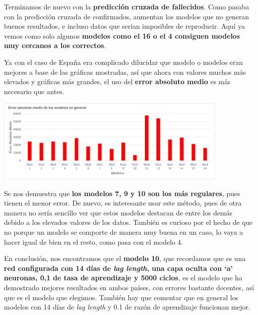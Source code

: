 \documentclass[12pt,a4paper, xcolor=table]{article}
\begin{document}
            Terminamos de nuevo con la \textbf{predicción cruzada de fallecidos}. Como pasaba con la predicción cruzada de confirmados, aumentan los modelos que no generan buenos resultados, e incluso datos que serían imposibles de reproducir. Aquí ya vemos como solo algunos \textbf{modelos como el 16 o el 4 consiguen modelos muy cercanos a los correctos}.

            \newpage

            Ya con el caso de España era complicado dilucidar que modelo o modelos eran mejores a base de las gráficas mostradas, así que ahora con valores muchos más elevados y gráficas más grandes, el uso del \textbf{error absoluto medio} es más necesario que antes.

            \begin{center}
                \centering
                \includegraphics[width=425px]{img/eam_BZ_parte2.png}
            \end{center}

            Se nos demuestra que \textbf{los modelos 7, 9 y 10 son los más regulares}, pues tienen el menor error. De nuevo, es interesante usar este método, pues de otra manera no sería sencillo ver que estos modelos destacan de entre los demás debido a los elevados valores de los datos. También es curioso por el hecho de que no porque un modelo se comporte de manera muy buena en un caso, lo vaya a hacer igual de bien en el resto, como pasa con el modelo 4.

            \vspace{2mm}

            En conclusión, nos encontramos que el \textbf{modelo 10}, que recordamos que es una \textbf{red configurada con 14 días de \textit{lag length}, una capa oculta con ‘a’ neuronas, 0,1 de tasa de aprendizaje y 5000 ciclos}, es el modelo que ha demostrado mejores resultados en ambos países, con errores bastante decentes, así que es el modelo que elegimos. También hay que comentar que en general los modelos con 14 días de \textit{lag length} y 0.1 de razón de aprendizaje funcionan mejor.
\end{document}
